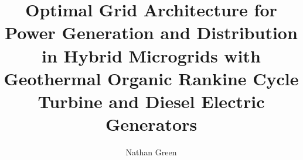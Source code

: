 \documentclass[12pt]{uafthesis}
\author{Nathan Green}
\title{Optimal Grid Architecture for Power Generation and Distribution in Hybrid Microgrids with Geothermal Organic Rankine Cycle Turbine and Diesel Electric Generators}
\begin{document}
\makesig
\maketitle



\tableofcontents
\listoffigures
\listoftables








\end{document}

